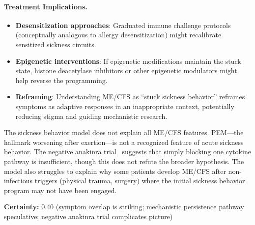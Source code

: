 \begin{speculation}
\paragraph{Treatment Implications.}
\begin{itemize}
    \item \textbf{Desensitization approaches}: Graduated immune challenge protocols (conceptually analogous to allergy desensitization) might recalibrate sensitized sickness circuits.
    \item \textbf{Epigenetic interventions}: If epigenetic modifications maintain the stuck state, histone deacetylase inhibitors or other epigenetic modulators might help reverse the programming.
    \item \textbf{Reframing}: Understanding ME/CFS as ``stuck sickness behavior'' reframes symptoms as adaptive responses in an inappropriate context, potentially reducing stigma and guiding mechanistic research.
\end{itemize}

\begin{limitation}
The sickness behavior model does not explain all ME/CFS features. PEM---the hallmark worsening after exertion---is not a recognized feature of acute sickness behavior. The negative anakinra trial~\cite{Roerink2017anakinra} suggests that simply blocking one cytokine pathway is insufficient, though this does not refute the broader hypothesis. The model also struggles to explain why some patients develop ME/CFS after non-infectious triggers (physical trauma, surgery) where the initial sickness behavior program may not have been engaged.
\end{limitation}

\textbf{Certainty:} 0.40 (symptom overlap is striking; mechanistic persistence pathway speculative; negative anakinra trial complicates picture)
\end{speculation}

